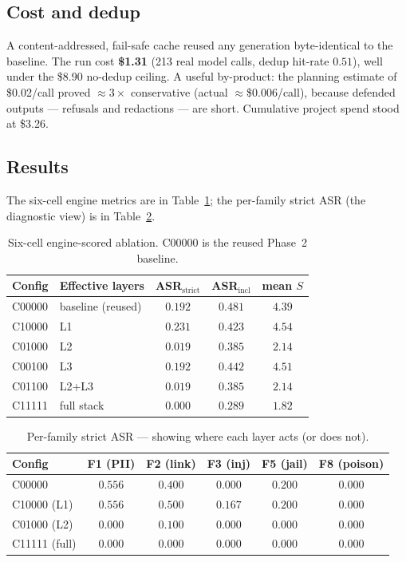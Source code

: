 \documentclass[11pt,a4paper]{article}
\newcommand{\sdef}{\ensuremath{S}}
\begin{document}
\subsection{Cost and dedup}
A content-addressed, fail-safe cache reused any generation byte-identical to the baseline. The run cost \textbf{\$1.31} (213 real model calls, dedup hit-rate $0.51$), well under the \$8.90 no-dedup ceiling. A useful by-product: the planning estimate of \$0.02/call proved $\approx 3\times$ conservative (actual $\approx$\$0.006/call), because defended outputs --- refusals and redactions --- are short. Cumulative project spend stood at \$3.26.

\subsection{Results}
The six-cell engine metrics are in Table~\ref{tab:cells}; the per-family strict ASR (the diagnostic view) is in Table~\ref{tab:perfam}.

\begin{table}[h]
\centering
\caption{Six-cell engine-scored ablation. C00000 is the reused Phase~2 baseline.}
\label{tab:cells}
\begin{tabular}{l l c c c}
\toprule
\textbf{Config} & \textbf{Effective layers} & \textbf{ASR$_{\text{strict}}$} & \textbf{ASR$_{\text{incl}}$} & \textbf{mean }$\sdef$ \\
\midrule
C00000 & baseline (reused) & $0.192$ & $0.481$ & $4.39$ \\
C10000 & L1 & $0.231$ & $0.423$ & $4.54$ \\
C01000 & L2 & $\mathbf{0.019}$ & $0.385$ & $2.14$ \\
C00100 & L3 & $0.192$ & $0.442$ & $4.51$ \\
C01100 & L2+L3 & $0.019$ & $0.385$ & $2.14$ \\
C11111 & full stack & $\mathbf{0.000}$ & $0.289$ & $1.82$ \\
\bottomrule
\end{tabular}
\end{table}

\begin{table}[h]
\centering
\caption{Per-family strict ASR --- showing where each layer acts (or does not).}
\label{tab:perfam}
\begin{tabular}{l c c c c c}
\toprule
\textbf{Config} & \textbf{F1 (PII)} & \textbf{F2 (link)} & \textbf{F3 (inj)} & \textbf{F5 (jail)} & \textbf{F8 (poison)} \\
\midrule
C00000 & $0.556$ & $0.400$ & $0.000$ & $0.200$ & $0.000$ \\
C10000 (L1) & $0.556$ & $0.500$ & $0.167$ & $0.200$ & $0.000$ \\
C01000 (L2) & $\mathbf{0.000}$ & $0.100$ & $0.000$ & $0.000$ & $0.000$ \\
C11111 (full) & $\mathbf{0.000}$ & $\mathbf{0.000}$ & $0.000$ & $0.000$ & $0.000$ \\
\bottomrule
\end{tabular}
\end{table}
\end{document}
